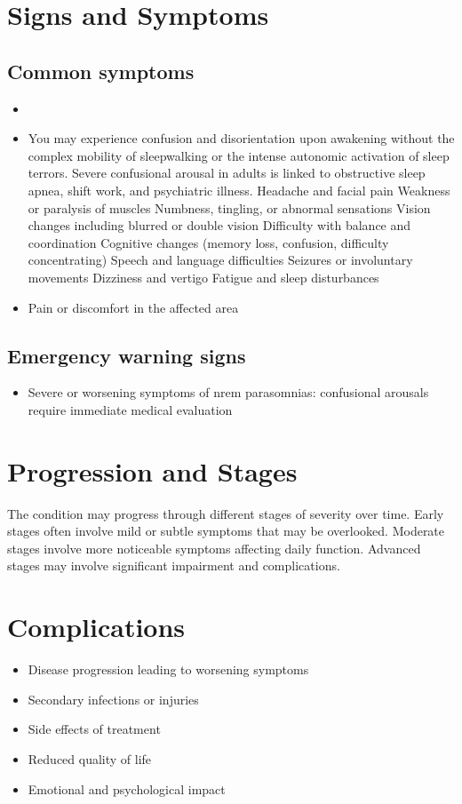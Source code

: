 \section{Signs and Symptoms}
\subsection{Common symptoms}
\begin{itemize}[noitemsep]
  \item \item You may experience confusion and disorientation upon awakening without the complex mobility of sleepwalking or the intense autonomic activation of sleep terrors. Severe confusional arousal in adults is linked to obstructive sleep apnea, shift work, and psychiatric illness. Headache and facial pain Weakness or paralysis of muscles Numbness, tingling, or abnormal sensations Vision changes including blurred or double vision Difficulty with balance and coordination Cognitive changes (memory loss, confusion, difficulty concentrating) Speech and language difficulties Seizures or involuntary movements Dizziness and vertigo Fatigue and sleep disturbances
  \item Pain or discomfort in the affected area
  \end{itemize}
\subsection{Emergency warning signs}
\begin{itemize}[noitemsep]
  \item Severe or worsening symptoms of nrem parasomnias: confusional arousals require immediate medical evaluation
\end{itemize}
\section{Progression and Stages}
The condition may progress through different stages of severity over time. Early stages often involve mild or subtle symptoms that may be overlooked. Moderate stages involve more noticeable symptoms affecting daily function. Advanced stages may involve significant impairment and complications.
\section{Complications}
\begin{itemize}[noitemsep]
  \item Disease progression leading to worsening symptoms
  \item Secondary infections or injuries
  \item Side effects of treatment
  \item Reduced quality of life
  \item Emotional and psychological impact
\end{itemize}
